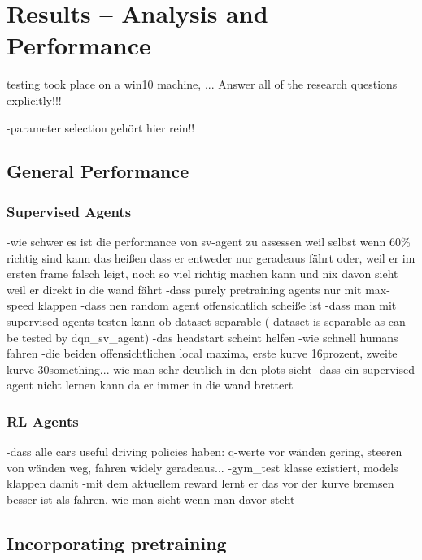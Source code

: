 \chapter{Results -- Analysis and Performance}

testing took place on a win10 machine, ...
Answer all of the research questions explicitly!!!

-parameter selection gehört hier rein!!

\section{General Performance}


\subsection{Supervised Agents}

-wie schwer es ist die performance von sv-agent zu assessen weil selbst wenn 60\% richtig sind kann das heißen dass er entweder nur geradeaus fährt oder, weil er im ersten frame falsch leigt, noch so viel richtig machen kann und nix davon sieht weil er direkt in die wand fährt
-dass purely pretraining agents nur mit max-speed klappen
-dass nen random agent offensichtlich scheiße ist
-dass man mit supervised agents testen kann ob dataset separable (-dataset is separable as can be tested by dqn\_sv\_agent)
-das headstart scheint helfen
-wie schnell humans fahren
-die beiden offensichtlichen local maxima, erste kurve 16prozent, zweite kurve 30something... wie man sehr deutlich in den plots sieht
-dass ein supervised agent nicht lernen kann da er immer in die wand brettert

\subsection{RL Agents}

-dass alle cars useful driving policies haben: q-werte vor wänden gering, steeren von wänden weg, fahren widely geradeaus... 
-gym\_test klasse existiert, models klappen damit
-mit dem aktuellem reward lernt er das vor der kurve bremsen besser ist als fahren, wie man sieht wenn man davor steht


\section{Incorporating pretraining}

